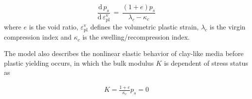 \begin{equation}
\frac{\mathrm d\, p_s}{\mathrm d\,\varepsilon^{\mathrm v}_{\mathrm{pl}}}\,=\,
\frac{(1+e)p_s}{\lambda_c-\kappa_c}
\label{Mp_eqn:cc_pcn}
\end{equation}
where $e$ is the void ratio, $\varepsilon^{\mathrm v}_{\mathrm{pl}}$ defines the volumetric plastic strain, $\lambda_c$ is the virgin compression index and $\kappa_c$ is the swelling/recompression index.

The model also describes the nonlinear elastic behavior of clay-like media before plastic yielding occurs, in which the bulk modulus $K$ is dependent of stress status as

\begin{eqnarray}
K=\frac{1+e}{\kappa_c}p_s=0
\label{Mp_eqn:cc_K}
\end{eqnarray}
